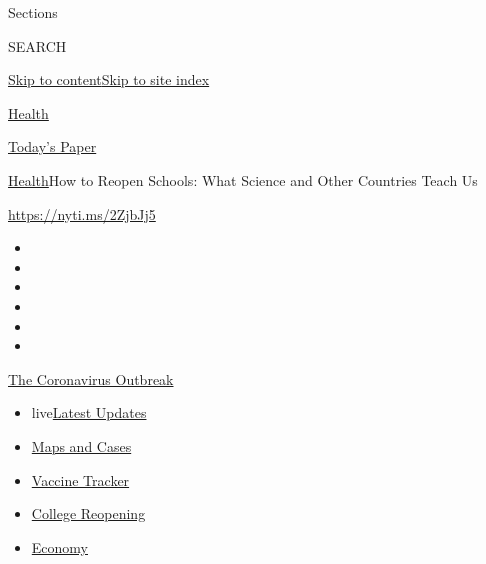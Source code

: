Sections

SEARCH

\protect\hyperlink{site-content}{Skip to
content}\protect\hyperlink{site-index}{Skip to site index}

\href{https://www.nytimes.com/section/health}{Health}

\href{https://myaccount.nytimes.com/auth/login?response_type=cookie\&client_id=vi}{}

\href{https://www.nytimes.com/section/todayspaper}{Today's Paper}

\href{/section/health}{Health}\textbar{}How to Reopen Schools: What
Science and Other Countries Teach Us

\url{https://nyti.ms/2ZjbJj5}

\begin{itemize}
\item
\item
\item
\item
\item
\item
\end{itemize}

\href{https://www.nytimes.com/news-event/coronavirus?action=click\&pgtype=Article\&state=default\&region=TOP_BANNER\&context=storylines_menu}{The
Coronavirus Outbreak}

\begin{itemize}
\tightlist
\item
  live\href{https://www.nytimes.com/2020/08/03/world/coronavirus-covid-19.html?action=click\&pgtype=Article\&state=default\&region=TOP_BANNER\&context=storylines_menu}{Latest
  Updates}
\item
  \href{https://www.nytimes.com/interactive/2020/us/coronavirus-us-cases.html?action=click\&pgtype=Article\&state=default\&region=TOP_BANNER\&context=storylines_menu}{Maps
  and Cases}
\item
  \href{https://www.nytimes.com/interactive/2020/science/coronavirus-vaccine-tracker.html?action=click\&pgtype=Article\&state=default\&region=TOP_BANNER\&context=storylines_menu}{Vaccine
  Tracker}
\item
  \href{https://www.nytimes.com/2020/08/02/us/covid-college-reopening.html?action=click\&pgtype=Article\&state=default\&region=TOP_BANNER\&context=storylines_menu}{College
  Reopening}
\item
  \href{https://www.nytimes.com/live/2020/08/03/business/stock-market-today-coronavirus?action=click\&pgtype=Article\&state=default\&region=TOP_BANNER\&context=storylines_menu}{Economy}
\end{itemize}


